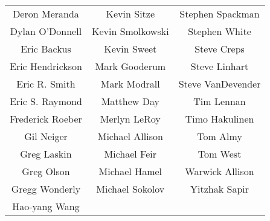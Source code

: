 \begin{center}
\begin{tabular}{ccc}
   Deron Meranda    &      Kevin Sitze       & Stephen Spackman \\
  Dylan O'Donnell   &    Kevin Smolkowski    &   Stephen White  \\
    Eric Backus     &      Kevin Sweet       &    Steve Creps   \\
 Eric Hendrickson   &     Mark Gooderum      &   Steve Linhart  \\
   Eric R. Smith    &      Mark Modrall      & Steve VanDevender\\
  Eric S. Raymond   &      Matthew Day       &    Tim Lennan    \\
 Frederick Roeber   &      Merlyn LeRoy      &  Timo Hakulinen  \\
    Gil Neiger      &    Michael Allison     &     Tom Almy     \\
    Greg Laskin     &      Michael Feir      &     Tom West     \\
    Greg Olson      &     Michael Hamel      &  Warwick Allison \\
  Gregg Wonderly    &    Michael Sokolov     &   Yitzhak Sapir  \\
   Hao-yang Wang    &                        &                  
\end{tabular}
\end{center}



